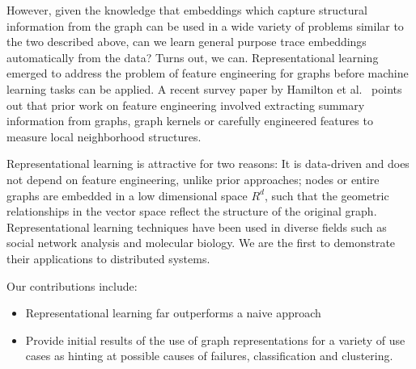 However, given the knowledge that embeddings which capture structural information from the graph can be used in a wide variety of problems similar to the two described above, can we learn general purpose trace embeddings automatically from the data? Turns out, we can. Representational learning emerged to address the problem of feature engineering for graphs before machine learning tasks can be applied. A recent survey paper by Hamilton et al.~\cite{corr_2017_abs-1709-05584} points out that prior work on feature engineering involved extracting summary information from graphs, graph kernels or carefully engineered features to measure local neighborhood structures. 

Representational learning is attractive for two reasons: It is data-driven and does not depend on feature engineering, unlike prior approaches; nodes or entire graphs are embedded in a low dimensional space $R^{d}$, such that the geometric relationships in the vector space reflect the structure of the original graph. Representational learning techniques have been used in diverse fields such as social network analysis and molecular biology. We are the first to demonstrate their applications to distributed systems. 

Our contributions include:
\begin{itemize}
\item Representational learning far outperforms a naive approach 
\item Provide initial results of the use of graph representations for a variety of use cases as hinting at possible causes of failures, classification and clustering.
\end{itemize}



